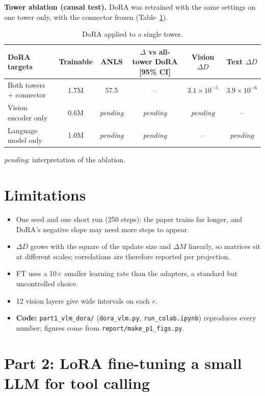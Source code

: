 \documentclass[10pt,a4paper]{article}
\newcommand{\dM}{\Delta M}
\newcommand{\dD}{\Delta D}
\newcommand{\code}[1]{\texttt{#1}}
\newcommand{\pending}{\textit{pending}}
\begin{document}
\textbf{Tower ablation (causal test).}
DoRA was retrained with the same settings on one tower only, with the connector frozen (Table~\ref{tab:abl}).
\begin{table}[!htbp]
  \centering\small
  \begin{tabular}{lccccc}
    \toprule
    DoRA targets & Trainable & ANLS & $\Delta$ vs all-tower DoRA [95\% CI] & Vision $\dD$ & Text $\dD$ \\
    \midrule
    Both towers + connector & 1.7M & 57.5 & --  & $3.1\times10^{-5}$ & $3.9\times10^{-6}$ \\
    Vision encoder only     & 0.6M & \pending & \pending & \pending & -- \\
    Language model only     & 1.0M & \pending & \pending & -- & \pending \\
    \bottomrule
  \end{tabular}
  \caption{DoRA applied to a single tower.}
  \label{tab:abl}
\end{table}

\pending: interpretation of the ablation.

\section{Limitations}
\begin{itemize}
  \item One seed and one short run (250 steps); the paper trains far longer, and DoRA's negative slope may need more steps to appear.
  \item $\dD$ grows with the square of the update size and $\dM$ linearly, so matrices sit at different scales; correlations are therefore reported per projection.
  \item FT uses a 10$\times$ smaller learning rate than the adapters, a standard but uncontrolled choice.
  \item 12 vision layers give wide intervals on each $r$.
  \item \textbf{Code:} \code{part1\_vlm\_dora/} (\code{dora\_vlm.py}, \code{run\_colab.ipynb}) reproduces every number; figures come from \code{report/make\_p1\_figs.py}.
\end{itemize}

\clearpage
\section*{Part 2: LoRA fine-tuning a small LLM for tool calling}
\small
\end{document}
